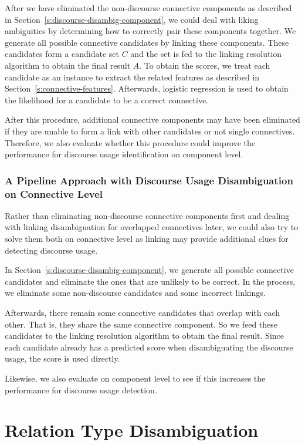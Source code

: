 After we have eliminated the non-discourse connective components as described
in Section~\ref{s:discourse-disambig-component}, we could
deal with liking ambiguities by determining how to correctly pair these
components together. We generate all possible connective candidates by
linking these components. These candidates form a candidate set $ C $ and the set is
fed to the linking resolution algorithm to obtain the final result $ A $.
To obtain the scores, we treat each candidate as an instance to
extract the related features as described in Section~\ref{s:connective-features}.
Afterwards, logistic regression is used to obtain the likelihood for a
candidate to be a correct connective.

After this procedure, additional connective components may have been eliminated if
they are unable to form a link with other candidates or not single connectives.
Therefore, we also evaluate whether this procedure could improve the performance
for discourse usage identification on component level.


\subsubsection{A Pipeline Approach with Discourse Usage Disambiguation on Connective Level}
\label{s:pipeline2}

Rather than eliminating non-discourse connective components first and
dealing with linking disambiguation for overlapped connectives later,
we could also try to solve them both on connective level as linking may
provide additional clues for detecting discourse usage. 

In Section~\ref{s:discourse-disambig-component}, we generate all possible
connective candidates and eliminate the ones that are unlikely to be correct.
In the process, we eliminate some non-discourse candidates and some incorrect
linkings.

Afterwards, there remain some connective candidates that overlap with each other.
That is, they share the same connective component. So we feed these candidates
to the linking resolution algorithm to obtain the final result. Since each candidate
already has a predicted score when disambiguating the discourse usage, the score
is used directly.

Likewise, we also evaluate on component level to see if this increases
the performance for discourse usage detection.

\section{Relation Type Disambiguation}

